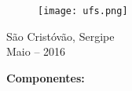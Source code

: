 \begin{titlepage}

\begin{center}
\begin{figure}[H]
	\centering
	\texttt{[image: ufs.png]}
\end{figure}
{\large \textbf \universidade}
\par
{\large \textbf \centro}
\par
{\large \textbf \departamento}
\par
{\large \textbf \curso}
\par
\vspace{60pt}

{\large \titulo}
\par
\vspace{60pt}

{\large \professor}
\par
\vfill

{\large São Cristóvão, Sergipe}\\
{\large Maio -- 2016}
\end{center}
\end{titlepage}

\setcounter{page}{2}

\begin{center}
{\large \textbf {Componentes:}}
\par
\vspace{12pt}
{\normalsize \alunoA}
\par
{\normalsize \alunoB}
\par
{\normalsize \alunoC}
\par
{\normalsize \alunoD}
\par
{\normalsize \alunoE}
\par
\end{center}
\clearpage

\renewcommand{\contentsname}{Conteúdo}
{
\hypersetup{linkcolor=black}
\tableofcontents
}